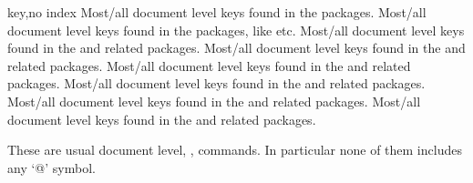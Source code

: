 \documentclass{article}
\begin{document}
\begin{describelist}{key,no index}
   {Most/all document level keys found in the  packages. }
   {Most/all document level keys found in the  packages, like  etc. }
   {Most/all document level keys found in the  and related packages. }
   {Most/all document level keys found in the  and related packages.}
   {Most/all document level keys found in the  and related packages.}
   {Most/all document level keys found in the  and related packages.}
   {Most/all document level keys found in the  and related packages.}
   {Most/all document level keys found in the  and related packages.}
\begin{tsremark}
  These are usual document level, \LaTeXe, commands. In particular none of them includes any `@' symbol.
\end{tsremark}  
\end{describelist}


\printbibliography







\end{document}
